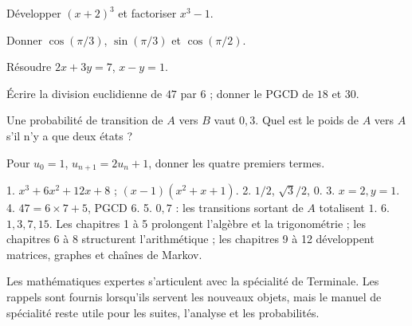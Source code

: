 \begin{questions}
\item Développer $(x+2)^3$ et factoriser $x^3-1$.
\item Donner $\cos(\pi/3)$, $\sin(\pi/3)$ et $\cos(\pi/2)$.
\item Résoudre $2x+3y=7$, $x-y=1$.
\item Écrire la division euclidienne de $47$ par $6$ ; donner le PGCD de $18$ et $30$.
\item Une probabilité de transition de $A$ vers $B$ vaut $0{,}3$. Quel est le poids de $A$ vers $A$ s'il n'y a que deux états ?
\item Pour $u_0=1$, $u_{n+1}=2u_n+1$, donner les quatre premiers termes.
\end{questions}
\begin{savoirfaire}
1. $x^3+6x^2+12x+8$ ; $(x-1)(x^2+x+1)$.
2. $1/2$, $\sqrt3/2$, $0$.
3. $x=2,y=1$.
4. $47=6\times7+5$, PGCD $6$.
5. $0{,}7$ : les transitions sortant de $A$ totalisent $1$.
6. $1,3,7,15$.
Les chapitres 1 à 5 prolongent l'algèbre et la trigonométrie ; les chapitres 6 à 8 structurent l'arithmétique ; les chapitres 9 à 12 développent matrices, graphes et chaînes de Markov.
\end{savoirfaire}
Les mathématiques expertes s'articulent avec la spécialité de Terminale. Les rappels sont fournis lorsqu'ils servent les nouveaux objets, mais le manuel de spécialité reste utile pour les suites, l'analyse et les probabilités.

